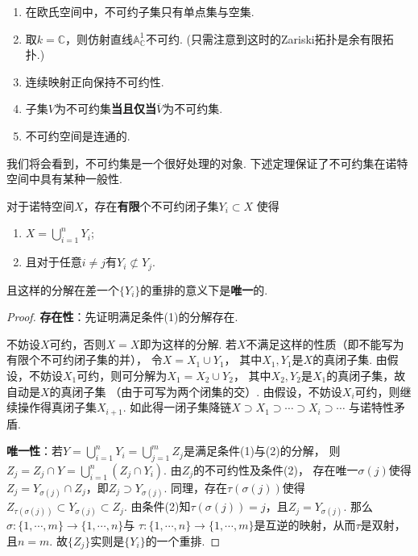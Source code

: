    \begin{remark}
        \begin{enumerate}
            \item 在欧氏空间中，不可约子集只有单点集与空集.
            \item 取$k=\mathbb{C}$，则仿射直线$\mathbb{A}^{1}_{\mathbb{C}}$不可约. 
                  (只需注意到这时的Zariski拓扑是余有限拓扑.)
            \item 连续映射正向保持不可约性. 
            \item 子集$V$为不可约集\textbf{当且仅当}$\overline{V}$为不可约集.
            \item 不可约空间是连通的.
        \end{enumerate}
    \end{remark}

    我们将会看到，不可约集是一个很好处理的对象. 下述定理保证了不可约集在诺特空间中具有某种一般性.

    \begin{theorem}[不可约分解]
        对于诺特空间$X$，存在\textbf{有限}个不可约闭子集$Y_{i} \subset X$
        使得
        \begin{enumerate}
            \item[(1)] $X=\bigcup_{i=1}^{n} Y_{i}$;
            \item[(2)] 且对于任意$i \neq j$有$Y_{i} \not\subset Y_{j}$.
        \end{enumerate}
        且这样的分解在差一个$\{Y_{i}\}$的重排的意义下是\textbf{唯一}的.
    \end{theorem}
    \begin{proof} \par
        \textbf{存在性}：先证明满足条件(1)的分解存在. \par
        不妨设$X$可约，否则$X=X$即为这样的分解. 若$X$不满足这样的性质（即不能写为有限个不可约闭子集的并），
        令$X = X_{1} \cup Y_{1}$，
        其中$X_{1},Y_{1}$是$X$的真闭子集.
        由假设，不妨设$X_{1}$可约，则可分解为$X_{1}=X_{2} \cup Y_{2}$，
        其中$X_{2},Y_{2}$是$X_{1}$的真闭子集，故自动是$X$的真闭子集
        （由于可写为两个闭集的交）. 由假设，不妨设$X_{i}$可约，则继续操作得真闭子集$X_{i+1}$.
        如此得一闭子集降链$X \supset X_{1} \supset \cdots \supset X_{i} \supset \cdots$
        与诺特性矛盾. \par

        \textbf{唯一性}：若$Y=\bigcup_{i=1}^{n} Y_{i} = \bigcup_{j=1}^{m} Z_{j}$是满足条件(1)与(2)的分解，
        则$Z_{j} = Z_{j} \cap Y = \bigcup_{i=1}^{n}(Z_{j} \cap Y_{i})$. 
        由$Z_{j}$的不可约性及条件(2)，
        存在唯一$\sigma(j)$使得$Z_{j}=Y_{\sigma(j)} \cap Z_{j}$，即$Z_{j} \supset Y_{\sigma(j)}$.
        同理，存在$\tau(\sigma(j))$使得$Z_{\tau(\sigma(j))} \subset Y_{\sigma(j)} \subset Z_{j}$. 
        由条件(2)知$\tau(\sigma(j))=j$，且$Z_{j} = Y_{\sigma(j)}$. 
        那么$\sigma\colon\{1,\cdots,m\} \rightarrow \{1,\cdots,n\}$与
        $\tau\colon\{1,\cdots,n\} \rightarrow \{1,\cdots,m\}$是互逆的映射，从而$\tau$是双射，且$n=m$.
        故$\{Z_{j}\}$实则是$\{Y_{i}\}$的一个重排. 
    \end{proof}
      
